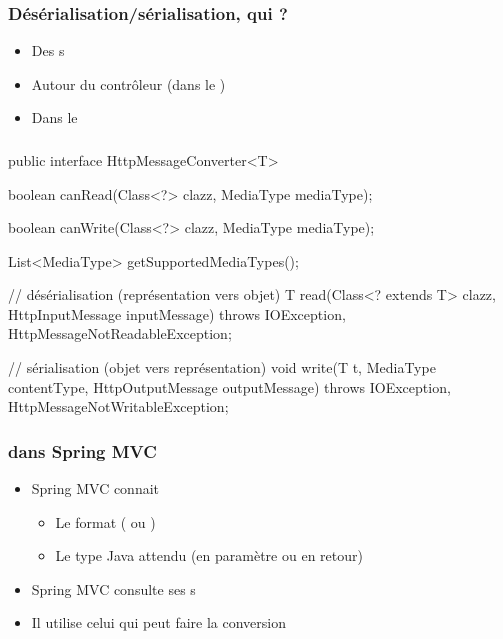 \begin{frame}[fragile]
 \frametitle{Désérialisation/sérialisation, qui ?}
 
 \begin{itemize}
  \item Des s
  \item Autour du contrôleur (dans le )
  \item Dans le 
 \end{itemize}

\end{frame}

\begin{frame}[fragile]
 \frametitle{}
 
 \begin{javacode}
public interface HttpMessageConverter<T> {

  boolean canRead(Class<?> clazz, MediaType mediaType);

  boolean canWrite(Class<?> clazz, MediaType mediaType);

  List<MediaType> getSupportedMediaTypes();

  // d\'es\'erialisation (repr\'esentation vers objet)
  T read(Class<? extends T> clazz, HttpInputMessage inputMessage)
      throws IOException, HttpMessageNotReadableException;
  
  // s\'erialisation (objet vers repr\'esentation)
  void write(T t, MediaType contentType, 
             HttpOutputMessage outputMessage)
      throws IOException, HttpMessageNotWritableException;

}
 \end{javacode}

\end{frame}

\begin{frame}[fragile]
 \frametitle{ dans Spring MVC}
 
 \begin{itemize}
  \item Spring MVC connait
  \begin{itemize}
   \item Le format ( ou )
   \item Le type Java attendu (en paramètre ou en retour)
  \end{itemize}
  \item Spring MVC consulte ses s
  \item Il utilise celui qui peut faire la conversion
 \end{itemize}

\end{frame} 
 
